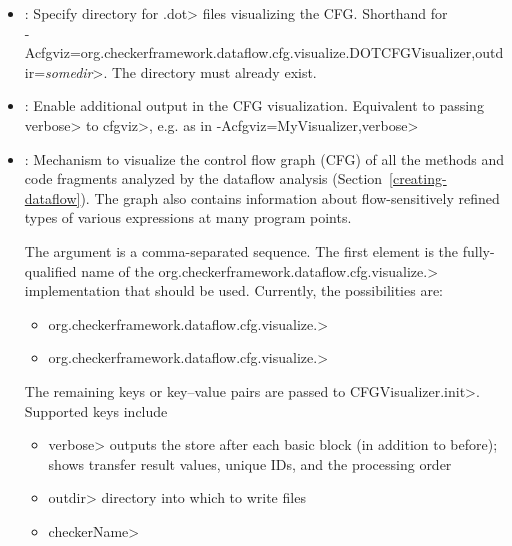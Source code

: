 \begin{itemize}

\item {}:
  Specify directory for \<.dot> files visualizing the CFG\@.
  Shorthand for\\
  \<-Acfgviz=org.checkerframework.dataflow.cfg.visualize.DOTCFGVisualizer,outdir=\emph{somedir}>.
  The directory must already exist.

\item {}:
  Enable additional output in the CFG visualization.
  Equivalent to passing \<verbose> to \<cfgviz>, e.g. as in
  \<-Acfgviz=MyVisualizer,verbose>

\item {}:
  Mechanism to visualize the control flow graph (CFG) of
  all the methods and code fragments
  analyzed by the dataflow analysis (Section~\ref{creating-dataflow}).
  The graph also contains information about flow-sensitively refined
  types of various expressions at many program points.

  The argument is a comma-separated sequence.
  The first element is the fully-qualified name of the
  \<org.checkerframework.dataflow.cfg.visualize.> implementation
  that should be used. Currently, the possibilities are:
  \begin{itemize}
  \item \<org.checkerframework.dataflow.cfg.visualize.>
  \item \<org.checkerframework.dataflow.cfg.visualize.>
  \end{itemize}
  The remaining keys or key--value pairs are
  passed to \<CFGVisualizer.init>.  Supported keys include
  \begin{itemize}
  \item \<verbose>
    outputs the store after each basic block (in addition to before);
    shows transfer result values, unique IDs, and the processing order
  \item \<outdir> directory into which to write files
  \item \<checkerName>
  \end{itemize}

\end{itemize}


